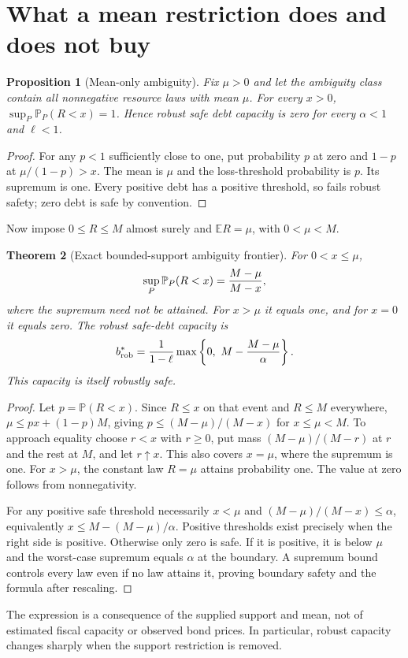 \documentclass[11pt,a4paper]{article}
\newtheorem{theorem}{Theorem}[section]
\newtheorem{proposition}[theorem]{Proposition}
\theoremstyle{definition}
\theoremstyle{remark}
\newcommand{\E}{\mathbb{E}}
\newcommand{\Prob}{\mathbb{P}}
\begin{document}
\section{What a mean restriction does and does not buy}
\begin{proposition}[Mean-only ambiguity]
Fix $\mu>0$ and let the ambiguity class contain all nonnegative resource laws with mean $\mu$. For every $x>0$, $\sup_P\Prob_P(R<x)=1$. Hence robust safe debt capacity is zero for every $\alpha<1$ and $\ell<1$.
\end{proposition}
\begin{proof}
For any $p<1$ sufficiently close to one, put probability $p$ at zero and $1-p$ at $\mu/(1-p)>x$. The mean is $\mu$ and the loss-threshold probability is $p$. Its supremum is one. Every positive debt has a positive threshold, so fails robust safety; zero debt is safe by convention.
\end{proof}
Now impose $0\le R\le M$ almost surely and $\E R=\mu$, with $0<\mu<M$.
\begin{theorem}[Exact bounded-support ambiguity frontier]
For $0<x\le\mu$,
\[
 \sup_P\Prob_P(R<x)={M-\mu\over M-x},
\]
where the supremum need not be attained. For $x>\mu$ it equals one, and for $x=0$ it equals zero. The robust safe-debt capacity is
\[
 b_{\rm rob}^*={1\over1-\ell}
       \max\left\{0,\ M-{M-\mu\over\alpha}\right\}.
\]
This capacity is itself robustly safe.
\end{theorem}
\begin{proof}
Let $p=\Prob(R<x)$. Since $R\le x$ on that event and $R\le M$ everywhere,
$\mu\le px+(1-p)M$, giving $p\le(M-\mu)/(M-x)$ for $x\le\mu<M$. To approach equality choose $r<x$ with $r\ge0$, put mass $(M-\mu)/(M-r)$ at $r$ and the rest at $M$, and let $r\uparrow x$. This also covers $x=\mu$, where the supremum is one. For $x>\mu$, the constant law $R=\mu$ attains probability one. The value at zero follows from nonnegativity.

For any positive safe threshold necessarily $x<\mu$ and
$(M-\mu)/(M-x)\le\alpha$, equivalently
$x\le M-(M-\mu)/\alpha$. Positive thresholds exist precisely when the right side is positive. Otherwise only zero is safe. If it is positive, it is below $\mu$ and the worst-case supremum equals $\alpha$ at the boundary. A supremum bound controls every law even if no law attains it, proving boundary safety and the formula after rescaling.
\end{proof}
The expression is a consequence of the supplied support and mean, not of estimated fiscal capacity or observed bond prices. In particular, robust capacity changes sharply when the support restriction is removed.
\end{document}
